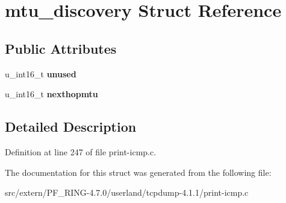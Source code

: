 \hypertarget{structmtu__discovery}{
\section{mtu\_\-discovery Struct Reference}
\label{structmtu__discovery}
}
\subsection*{Public Attributes}
\begin{DoxyCompactItemize}
\item 
\hypertarget{structmtu__discovery_ac9ec5a7cb47e51816c61fe69e3921117}{
u\_\-int16\_\-t {\bfseries unused}}
\label{structmtu__discovery_ac9ec5a7cb47e51816c61fe69e3921117}

\item 
\hypertarget{structmtu__discovery_a9179c560556bb1e99b3021beab891971}{
u\_\-int16\_\-t {\bfseries nexthopmtu}}
\label{structmtu__discovery_a9179c560556bb1e99b3021beab891971}

\end{DoxyCompactItemize}


\subsection{Detailed Description}


Definition at line 247 of file print-\/icmp.c.



The documentation for this struct was generated from the following file:\begin{DoxyCompactItemize}
\item 
src/extern/PF\_\-RING-\/4.7.0/userland/tcpdump-\/4.1.1/print-\/icmp.c\end{DoxyCompactItemize}
